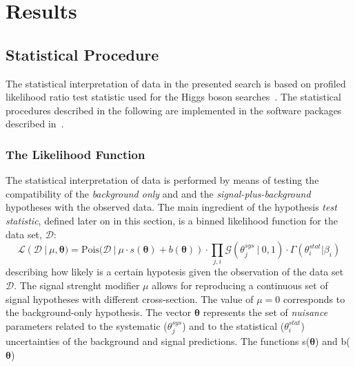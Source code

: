 
\section{Results}
\label{sec:result}

\subsection{Statistical Procedure }
\label{sec:limits}
The statistical interpretation of data in the presented search is based on profiled likelihood ratio test statistic used
for the Higgs boson searches~\cite{lhclimits}. The statistical procedures described in the 
following are implemented in the software packages described in~\cite{roofit,roostat,histfactory}.

\subsubsection{The Likelihood Function}
The statistical interpretation of data is performed by means of testing the compatibility
of the \textit{background only}  and and the \textit{signal-plus-background}  hypotheses with the observed data.  
The main ingredient of the hypothesis \emph{test statistic}, defined later on in this section,  
is a binned likelihood function for the data set, $\mathcal{D}$:
\begin{equation}\label{likelihood}
\mathcal{L}(\mathcal{D}~|~\mu, \boldsymbol{\theta}) = \text{Pois(}\mathcal{D}~ |~ \mu \cdot s(\boldsymbol{\theta}) 
	+ b(\boldsymbol{\theta})) \cdot \prod_{j,i}\mathcal{G}(\theta_j^{sys} ~ | ~ 0, 1) \cdot \Gamma(\theta^{stat}_i | \beta_i)
\end{equation}
describing how likely is a certain hypotesis given the observation of the data set $\mathcal{D}$.
The signal strenght modifier $\mu$ allows for reproducing a continuous set of signal hypotheses with 
different cross-section. The value of $\mu= 0$ corresponds to the background-only hypothesis. 
The vector $\boldsymbol{\theta}$ represents the set of \emph{nuisance} parameters  related to
the systematic ($\theta_j^{sys}$) and to the statistical ($\theta^{stat}_i$) 
uncertainties of the background and signal predictions. 
The functions s($\boldsymbol{\theta}$) and  b($\boldsymbol{\theta}$)
